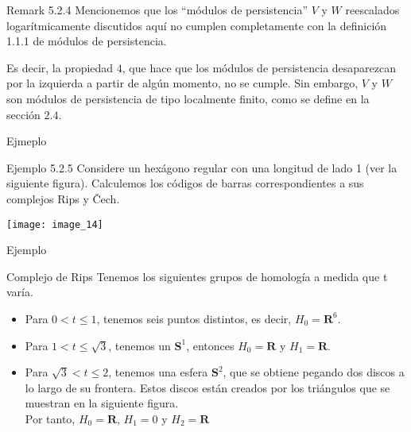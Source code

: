 \documentclass{beamer}
\begin{document}
\begin{frame}{}
    \begin{block}{Remark 5.2.4}
       Mencionemos que los “módulos de persistencia” $V$ y $W$ reescalados logarítmicamente discutidos aquí no cumplen completamente con la definición 1.1.1 de módulos de persistencia. 
       \newline
       \pause
       
       Es decir, la propiedad $4$, que hace que los módulos de persistencia desaparezcan por la izquierda a partir de algún momento, no se cumple. Sin embargo, $V$ y $W$ son módulos de persistencia de tipo localmente finito, como se define en la sección $2.4.$
    \end{block}
\end{frame}

\begin{frame}{Ejmeplo}
    \begin{block}{Ejemplo 5.2.5}
       Considere un hexágono regular con una longitud de lado 1 (ver la siguiente figura).
       \newline
       Calculemos los códigos de barras correspondientes a sus complejos Rips y \v{C}ech.
    \end{block}

    \newline
    \pause
    \texttt{[image: image\_14]}
\end{frame}

\begin{frame}{Ejemplo}
    \begin{block}{Complejo de Rips}
       Tenemos los siguientes grupos de homología a medida que t varía.
       \newline
       \pause

       \begin{itemize}
           \item Para $0<t \leq 1$, tenemos seis puntos distintos, es decir, $H_{0}=\mathbf{R}^{6}$.
           \pause
           \item Para $1<t \leq \sqrt{3}$, tenemos un $\mathbf{S}^{1}$, entonces $H_{0}=\mathbf{R}$ y $H_{1}=\mathbf{R}$.
           \pause
           \item Para $\sqrt{3} < t \leq 2$, tenemos una esfera $\mathbf{S}^{2}$, que se obtiene pegando dos discos a lo largo de su frontera. Estos discos están creados por los triángulos que se muestran en la siguiente figura.\\

           Por tanto, $H_0=\mathbf{R}$, $H_1=0$ y $H_2=\mathbf{R}$
       \end{itemize}
    \end{block}
\end{frame}
\end{document}
